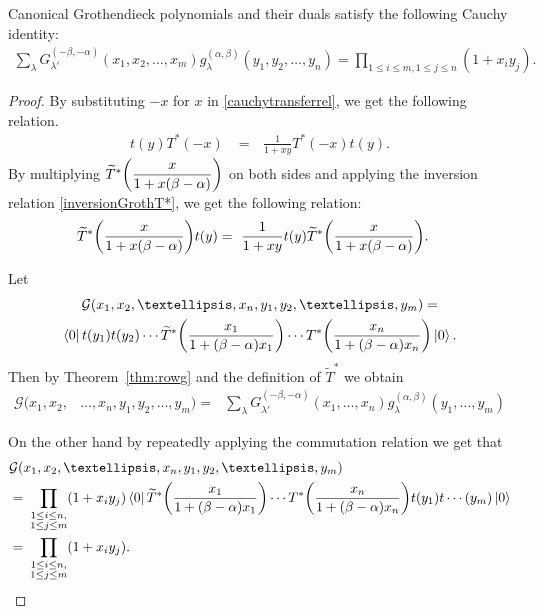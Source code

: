 \documentclass[ALCO, Unicode]{cedram}
\DeclarePairedDelimiter\autobracket{(}{)}
\newcommand{\br}[1]{\autobracket*{#1}}
\newcommand{\bra}[1]{\left\langle #1\right|}
\newcommand{\ket}[1]{\left|#1\right\rangle}
\newcommand\g{{g^{(\alpha,\beta)}_{\lambda}}}
\begin{document}
\begin{thm}
\label{involcauchy}
Canonical Grothendieck polynomials and their duals  satisfy the following Cauchy identity:
\begin{align*}
    \sum_{\lambda}G^{(-\beta,-\alpha)}_{\lambda'}(x_1,x_2,\dots,x_m) g^{(\alpha,\beta)}_{\lambda}(y_1,y_2,\dots,y_n)=\prod_{1\le i\le m,1\le j\le n} {(1+x_i y_j)}.
\end{align*}
\end{thm}
\begin{proof}
By substituting $-x$ for $x$ in \eqref{cauchytransferrel}, we get the following relation.
\begin{align*}
{t}(y) {T^{*}}(-x)&=\text{ } \frac{1}{1+xy} {T^{*}}(-x) {t}(y).
\end{align*}
By multiplying $\widetilde{T}^{*}\br{\dfrac{x}{1+x(\beta-\alpha)}}$ on both sides and applying the inversion relation \eqref{inversionGrothT*}, we get the following relation:
\begin{align*}
\widetilde{T}^{*} \br{\dfrac{x}{1+x(\beta-\alpha)}}{t}(y)&=\text{ } \frac{1}{1+xy}  {t}(y)\widetilde{T}^{*} \br{\dfrac{x}{1+x(\beta-\alpha)}}.
\end{align*}

Let 
\begin{multline*}
\mathcal{G}(x_1,x_2,\dots, x_n,y_1,y_2,\dots,y_m)=\\
\bra{0}{t}(y_1){t}(y_2)\cdots {\widetilde{T}^{*}}\br{\dfrac{x_1}{1+(\beta-\alpha)x_1}}\cdots {T^{*}}\br{\dfrac{x_n}{1+(\beta-\alpha)x_n}}\ket{0}.
\end{multline*}
Then by Theorem~\ref{thm:rowg} and the definition of $\widetilde{T}^{*}$ we obtain
\begin{align*}
\mathcal{G}(x_1,x_2,&\dots, x_n,y_1,y_2,\dots,y_m)
=\text{ }\sum_{\lambda}G_{\lambda'}^{(-\beta,-\alpha)}(x_1,\dots,x_n)\g(y_1,\dots,y_m)
\end{align*}

On the other hand by repeatedly applying the commutation relation we get that
\begin{align*}
\mathcal{G}(&x_1,x_2,\dots, x_n,y_1,y_2,\dots,y_m)\\
=&\text{ }\prod_{\substack{1\le i\le n,\\
    1 \le j\le m}}(1+x_iy_j)\bra{0} {\widetilde{T}^{*}}\br{\dfrac{x_1}{1+(\beta-\alpha)x_1}}\cdots {T^{*}}\br{\dfrac{x_n}{1+(\beta-\alpha)x_n}} {t}(y_1){t}\cdots(y_m)\ket{0}\\
=&\text{ }\prod_{\substack{1\le i\le n,\\
    1 \le j\le m}}(1+x_iy_j).\qedhere
 \end{align*}
\end{proof}
\end{document}
